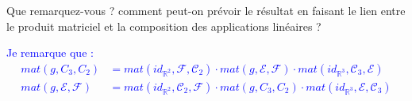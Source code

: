 \documentclass[a4paper,12pt]{article}
\def\R{\mathbb{R}}
\newcommand{\add}[1]{\textcolor{blue}{#1}}
\begin{document}
\begin{exercice}
\begin{enumerate}
\begin{enumerate}
                     Que remarquez-vous ? comment peut-on prévoir le résultat en faisant le lien entre le produit matriciel et la composition des applications linéaires ?

                     \add{
                     Je remarque que :
                     \begin{align*}
                         mat(g,C_3,C_2)&=mat(id_{\R^2},\mathcal F, \mathcal C_2) \cdot mat(g,\mathcal E, \mathcal F) \cdot mat(id_{\R^3},\mathcal C_3, \mathcal E)\\
                         mat(g,\mathcal E, \mathcal F)&=mat(id_{\R^2},\mathcal C_2, \mathcal F)\cdot mat(g,C_3,C_2) \cdot mat(id_{\R^3},\mathcal E, \mathcal C_3)
                     \end{align*}
                     }
             \end{enumerate}
    \end{enumerate}

\end{exercice}
\end{document}
